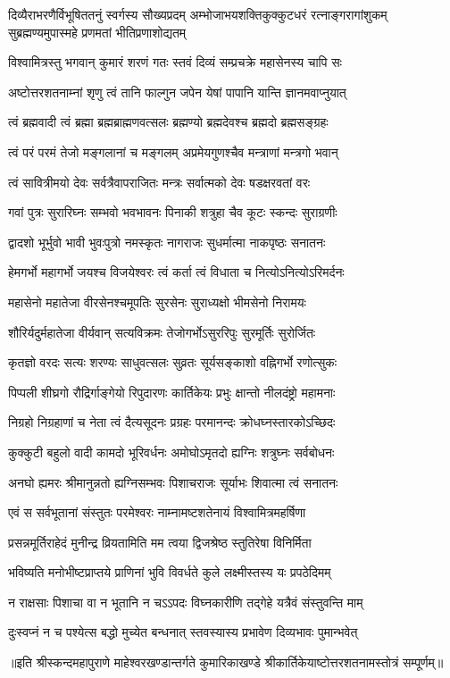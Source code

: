 
{दिव्यैराभरणैर्विभूषिततनुं स्वर्गस्य सौख्यप्रदम्}
{अम्भोजाभयशक्तिकुक्कुटधरं रत्नाङ्गरागांशुकम्}
{सुब्रह्मण्यमुपास्महे प्रणमतां भीतिप्रणाशोद्यतम्}

\twolineshloka
{विश्वामित्रस्तु भगवान् कुमारं शरणं गतः}
{स्तवं दिव्यं सम्प्रचक्रे महासेनस्य चापि सः}

\twolineshloka
{अष्टोत्तरशतनाम्नां शृणु त्वं तानि फाल्गुन}
{जपेन येषां पापानि यान्ति ज्ञानमवाप्नुयात्}

\twolineshloka
{त्वं ब्रह्मवादी त्वं ब्रह्मा ब्रह्मब्राह्मणवत्सलः}
{ब्रह्मण्यो ब्रह्मदेवश्च ब्रह्मदो ब्रह्मसङ्ग्रहः}

\twolineshloka
{त्वं परं परमं तेजो मङ्गलानां च मङ्गलम्}
{अप्रमेयगुणश्चैव मन्त्राणां मन्त्रगो भवान्}

\twolineshloka
{त्वं सावित्रीमयो देवः सर्वत्रैवापराजितः}
{मन्त्रः सर्वात्मको देवः षडक्षरवतां वरः}

\twolineshloka
{गवां पुत्रः सुरारिघ्नः सम्भवो भवभावनः}
{पिनाकी शत्रुहा चैव कूटः स्कन्दः सुराग्रणीः}

\twolineshloka
{द्वादशो भूर्भुवो भावी भुवःपुत्रो नमस्कृतः}
{नागराजः सुधर्मात्मा नाकपृष्ठः सनातनः}

\twolineshloka
{हेमगर्भो महागर्भो जयश्च विजयेश्वरः}
{त्वं कर्ता त्वं विधाता च नित्योऽनित्योऽरिमर्दनः}

\twolineshloka
{महासेनो महातेजा वीरसेनश्चमूपतिः}
{सुरसेनः सुराध्यक्षो भीमसेनो निरामयः}

\twolineshloka
{शौरिर्यदुर्महातेजा वीर्यवान् सत्यविक्रमः}
{तेजोगर्भोऽसुररिपुः सुरमूर्तिः सुरोर्जितः}

\twolineshloka
{कृतज्ञो वरदः सत्यः शरण्यः साधुवत्सलः}
{सुव्रतः सूर्यसङ्काशो वह्निगर्भो रणोत्सुकः}

\twolineshloka
{पिप्पली शीघ्रगो रौद्रिर्गाङ्गेयो रिपुदारणः}
{कार्तिकेयः प्रभुः क्षान्तो नीलदंष्ट्रो महामनाः}

\twolineshloka
{निग्रहो निग्रहाणां च नेता त्वं दैत्यसूदनः}
{प्रग्रहः परमानन्दः क्रोधघ्नस्तारकोऽच्छिदः}

\twolineshloka
{कुक्कुटी बहुलो वादी कामदो भूरिवर्धनः}
{अमोघोऽमृतदो ह्यग्निः शत्रुघ्नः सर्वबोधनः}

\twolineshloka
{अनघो ह्यमरः श्रीमानुन्नतो ह्यग्निसम्भवः}
{पिशाचराजः सूर्याभः शिवात्मा त्वं सनातनः}

\twolineshloka
{एवं स सर्वभूतानां संस्तुतः परमेश्वरः}
{नाम्नामष्टशतेनायं विश्वामित्रमहर्षिणा}

\twolineshloka
{प्रसन्नमूर्तिराहेदं मुनीन्द्र व्रियतामिति}
{मम त्वया द्विजश्रेष्ठ स्तुतिरेषा विनिर्मिता}

\twolineshloka
{भविष्यति मनोभीष्टप्राप्तये प्राणिनां भुवि}
{विवर्धते कुले लक्ष्मीस्तस्य यः प्रपठेदिमम्}

\twolineshloka
{न राक्षसाः पिशाचा वा न भूतानि न चऽऽपदः}
{विघ्नकारीणि तद्गेहे यत्रैवं संस्तुवन्ति माम्}

\twolineshloka
{दुःस्वप्नं न च पश्येत्स बद्धो मुच्येत बन्धनात्}
{स्तवस्यास्य प्रभावेण दिव्यभावः पुमान्भवेत्}

{॥इति श्रीस्कन्दमहापुराणे माहेश्वरखण्डान्तर्गते कुमारिकाखण्डे श्रीकार्तिकेयाष्टोत्तरशतनामस्तोत्रं सम्पूर्णम्॥}